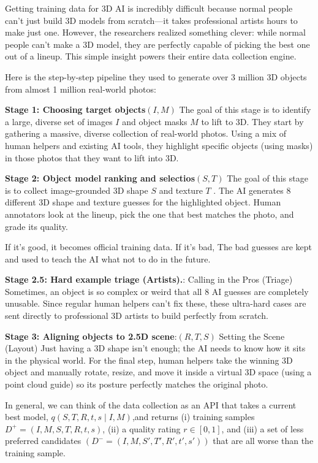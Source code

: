 \documentclass[manuscript,review]{acmart}
\begin{document}
Getting training data for 3D AI is incredibly difficult because normal people can't just build 3D models from scratch—it takes professional artists hours to make just one. However, the researchers realized something clever: while normal people can't make a 3D model, they are perfectly capable of picking the best one out of a lineup. This simple insight powers their entire data collection engine.

Here is the step-by-step pipeline they used to generate over 3 million 3D objects from almost 1 million real-world photos:

\textbf{Stage 1: Choosing target objects}$(I, M)$ The goal of this stage is to identify a large, diverse set of images $I$ and object masks $M$ to lift to 3D. They start by gathering a massive, diverse collection of real-world photos. Using a mix of human helpers and existing AI tools, they highlight specific objects (using masks) in those photos that they want to lift into 3D.

\textbf{Stage 2: Object model ranking and selectios}$(S, T)$ The goal of this stage is to collect image-grounded 3D shape $S$ and texture $T$ . The AI generates 8 different 3D shape and texture guesses for the highlighted object. Human annotators look at the lineup, pick the one that best matches the photo, and grade its quality.

If it's good, it becomes official training data. If it's bad, The bad guesses are kept and used to teach the AI what not to do in the future.

\textbf{Stage 2.5: Hard example triage (Artists).}: Calling in the Pros (Triage) Sometimes, an object is so complex or weird that all 8 AI guesses are completely unusable. Since regular human helpers can't fix these, these ultra-hard cases are sent directly to professional 3D artists to build perfectly from scratch.

\textbf{Stage 3: Aligning objects to 2.5D scene}:$(R,T,S)$ Setting the Scene (Layout) Just having a 3D shape isn't enough; the AI needs to know how it sits in the physical world. For the final step, human helpers take the winning 3D object and manually rotate, resize, and move it inside a virtual 3D space (using a point cloud guide) so its posture perfectly matches the original photo.

In general, we can think of the data collection as an API that takes a current best model, $q(S, T, R, t, s \mid I, M )$,and returns (i) training samples $D^+ = (I, M, S, T, R, t, s)$, (ii) a quality rating $r \in [0, 1]$, and (iii) a set of less preferred candidates $(D^- = (I, M, S', T', R', t', s'))$ that are all worse than the training sample.
\end{document}
